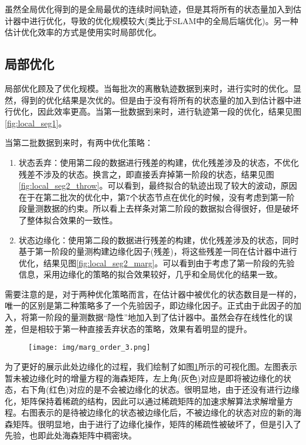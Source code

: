 \documentclass[12pt, onecolumn]{article}
\newcommand\normf{\fangsong}
\begin{document}
		虽然全局优化得到的是全局最优的连续时间轨迹，但是其将所有的状态量加入到估计器中进行优化，导致的优化规模较大(类比于SLAM中的全局后端优化)。另一种估计优化效率的方式是使用实时局部优化。
		
		\subsection{\normf 局部优化}
		局部优化顾及了优化规模。当每批次的离散轨迹数据到来时，进行实时的优化。显然，得到的优化结果是次优的。但是由于没有将所有的状态量的加入到估计器中进行优化，因此效率更高。当第一批数据到来时，进行轨迹第一段的优化，结果见图\ref{fig:local_seg1}。
		
		当第二批数据到来时，有两中优化策略：
		\begin{enumerate}
		\item 状态丢弃：使用第二段的数据进行残差的构建，优化残差涉及的状态，不优化残差不涉及的状态。换言之，即直接丢弃掉第一阶段的状态，结果见图\ref{fig:local_seg2_throw}。可以看到，最终拟合的轨迹出现了较大的波动，原因在于在第二批次的优化中，第7个状态节点在优化的时候，没有考虑到第一阶段量测数据的约束。所以看上去样条对第二阶段的数据拟合得很好，但是破坏了整体拟合效果的一致性。
		
		\item 状态边缘化：使用第二段的数据进行残差的构建，优化残差涉及的状态，同时基于第一阶段的量测构建边缘化因子(残差)，将这些残差一同在估计器中进行优化，结果见图\ref{fig:local_seg2_marg}。可以看到由于考虑了第一阶段的先验信息，采用边缘化的策略的拟合效果较好，几乎和全局优化的结果一致。
		\end{enumerate}
			
		需要注意的是，对于两种优化策略而言，在估计器中被优化的状态数目是一样的，唯一的区别是第二种策略多了一个先验因子，即边缘化因子。正式由于此因子的加入，将第一阶段的量测数据“隐性”地加入到了估计器中。虽然会存在线性化的误差，但是相较于第一种直接丢弃状态的策略，效果有着明显的提升。
		
		\begin{figure}[t!]
		\centering
		\texttt{[image: img/marg\_order\_3.png]}
		
		\caption{\normf{边缘化过程可视化}}
		
		\label{fig:marg_visual}
		\end{figure}
		
		为了更好的展示此处边缘化的过程，我们绘制了如图\ref{fig:marg_visual}所示的可视化图。左图表示暂未被边缘化时的增量方程的海森矩阵，左上角(灰色)对应是即将被边缘化的状态，右下角(红色)对应的是不会被边缘化的状态。很明显地，由于还没有进行边缘化，矩阵保持着稀疏的结构，因此可以通过稀疏矩阵的加速求解算法求解增量方程。右图表示的是待被边缘化的状态被边缘化后，不被边缘化的状态对应的新的海森矩阵。很明显地，由于进行了边缘化操作，矩阵的稀疏性被破坏了，但是引入了先验，也即此处海森矩阵中稠密块。
		
\end{document}
